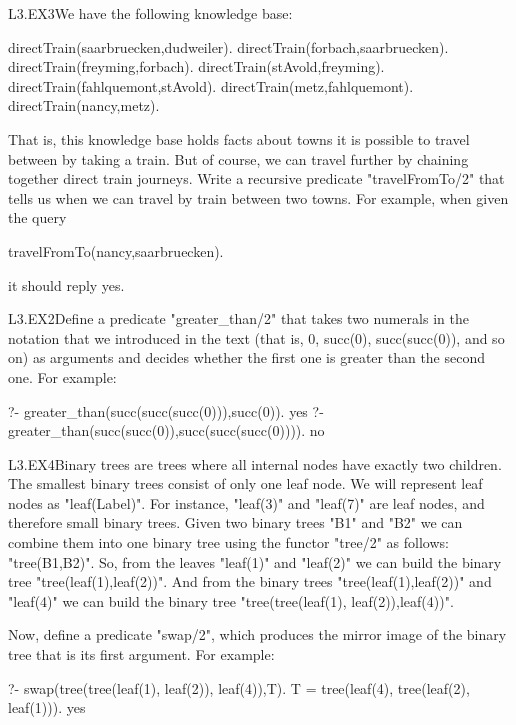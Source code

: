 \begin{LPNexercise}{L3.EX3}We have the following knowledge base:
\begin{LPNcodedisplay}
directTrain(saarbruecken,dudweiler).
directTrain(forbach,saarbruecken).
directTrain(freyming,forbach).
directTrain(stAvold,freyming).
directTrain(fahlquemont,stAvold).
directTrain(metz,fahlquemont).
directTrain(nancy,metz).
\end{LPNcodedisplay}

That is, this knowledge base holds facts about towns it is possible to
travel between by taking a  train.  But of course, we can
travel further by chaining together direct train journeys.  Write a
recursive predicate "travelFromTo/2" that tells us when we can
travel by train between two towns.  For example, when given the query
\begin{LPNcodedisplay}
travelFromTo(nancy,saarbruecken).
\end{LPNcodedisplay}
it should reply yes.
\end{LPNexercise}


\begin{LPNexercise}{L3.EX2}Define a predicate "greater_than/2"
that takes two numerals in the notation that we introduced in the text
(that is, 0, succ(0), succ(succ(0)), and so on) as arguments and
decides whether the first one is greater than the second one. For example:
\begin{LPNcodedisplay}
?- greater_than(succ(succ(succ(0))),succ(0)).
yes
?- greater_than(succ(succ(0)),succ(succ(succ(0)))).
no
\end{LPNcodedisplay}
\end{LPNexercise}
\begin{LPNexercise}{L3.EX4}Binary trees
are trees where all internal nodes have exactly two children. The
smallest binary trees consist of only one leaf node. We will represent
leaf nodes as "leaf(Label)". For instance, "leaf(3)" and "leaf(7)" are
leaf nodes, and therefore small binary trees. Given two binary trees
"B1" and "B2" we can combine them into one binary tree using the
functor "tree/2" as follows: "tree(B1,B2)".  So, from the leaves
"leaf(1)" and "leaf(2)" we can build the binary tree
"tree(leaf(1),leaf(2))". And from the binary trees
"tree(leaf(1),leaf(2))" and "leaf(4)" we can build the binary tree
"tree(tree(leaf(1), leaf(2)),leaf(4))".


Now, define a predicate "swap/2", which produces the mirror
image of the binary tree that is its first argument. For example:
\begin{LPNcodedisplay}
?- swap(tree(tree(leaf(1), leaf(2)), leaf(4)),T).
T = tree(leaf(4), tree(leaf(2), leaf(1))).
yes
\end{LPNcodedisplay}
\end{LPNexercise}





